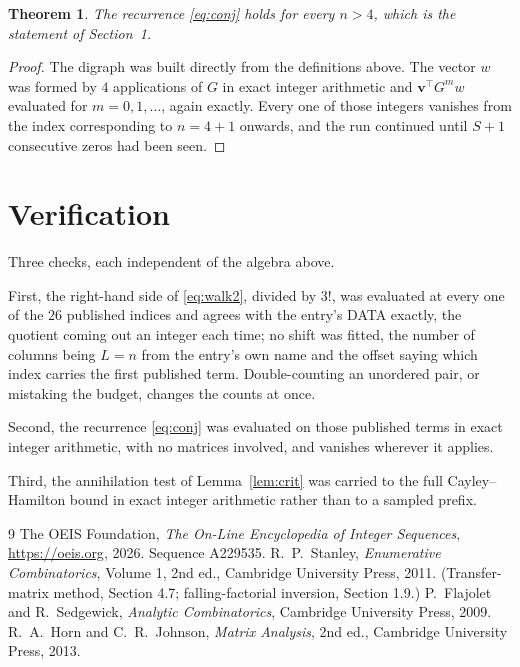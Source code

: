 \documentclass[11pt,a4paper]{article}
\theoremstyle{plain}
\newtheorem{theorem}{Theorem}
\theoremstyle{definition}
\begin{document}
\begin{theorem}
The recurrence \eqref{eq:conj} holds for every $n>4$, which is the statement of
Section~1.
\end{theorem}

\begin{proof}
The digraph was built directly from the definitions above. The vector $w$ was formed by
$4$ applications of $G$ in exact integer arithmetic and $\mathbf{v}^{\!\top}G^{m}w$
evaluated for $m=0,1,\dots$, again exactly. Every one of those integers vanishes from the
index corresponding to $n=4+1$ onwards, and the run continued until $S+1$ consecutive
zeros had been seen.
\end{proof}

\section{Verification}

Three checks, each independent of the algebra above.

First, the right-hand side of \eqref{eq:walk2}, divided by $3!$, was evaluated at every
one of the $26$ published indices and agrees with the entry's DATA exactly, the quotient
coming out an integer each time; no shift was fitted, the number of columns being $L=n$
from the entry's own name and the offset saying which index carries the first published term.
Double-counting an unordered pair, or mistaking the budget, changes the counts at once.

Second, the recurrence \eqref{eq:conj} was evaluated on those published terms in exact
integer arithmetic, with no matrices involved, and vanishes wherever it applies.

Third, the annihilation test of Lemma~\ref{lem:crit} was carried to the full
Cayley--Hamilton bound in exact integer arithmetic rather than to a sampled prefix.

\begin{thebibliography}{9}
 The OEIS Foundation, \emph{The On-Line Encyclopedia of Integer
Sequences}, \url{https://oeis.org}, 2026. Sequence A229535.
 R.~P.~Stanley, \emph{Enumerative Combinatorics}, Volume 1, 2nd ed.,
Cambridge University Press, 2011. (Transfer-matrix method, Section 4.7; falling-factorial
inversion, Section 1.9.)
 P.~Flajolet and R.~Sedgewick, \emph{Analytic Combinatorics}, Cambridge
University Press, 2009.
 R.~A.~Horn and C.~R.~Johnson, \emph{Matrix Analysis}, 2nd ed., Cambridge
University Press, 2013.
\end{thebibliography}
\end{document}
